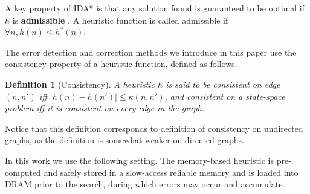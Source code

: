 \documentclass[letterpaper]{article}
\newtheorem{definition}{Definition}
\begin{document}
A key property of IDA* is that any solution found is guaranteed to be optimal if $h$ is \textbf{admissible} \cite{korf85}. A heuristic function is called admissible if $\forall n, h(n) \leq h^*(n)$.

%



The error detection and correction methods we introduce in this paper use the consistency property of a heuristic function, defined as follows.

\begin{definition}[Consistency]
A heuristic $h$ is said to be consistent on edge $(n,n')$ iff $|h(n) - h(n')| \le \kappa(n,n')$, and consistent on a state-space problem iff it is consistent on every edge in the graph.
\label{def:consistency}
\end{definition}
Notice that this definition corresponds to definition of consistency on undirected graphs, as the definition is somewhat weaker on directed graphs.

In this work we use the following setting. The memory-based heuristic is pre-computed and safely stored in a slow-access reliable memory and is loaded into DRAM
prior to the search, during which errors may occur and accumulate.
\end{document}
